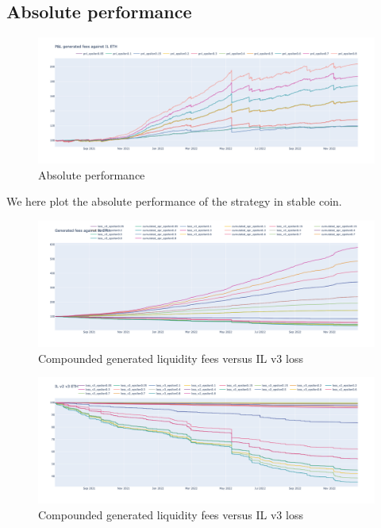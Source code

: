 \documentclass[conference]{IEEEtran}
\begin{document}
\subsection{Absolute performance}
\begin{figure}[h!]
    \centering
    \includegraphics[scale=0.15]{Plots/PL_generated_fees_against_IL_borrow rate_transaction cost_ETH.png}
    \caption{Absolute performance}
    \label{fig:abs_perf}
\end{figure}
We here plot the absolute performance of the strategy in stable coin. \\
\begin{figure}[h!]
    \centering
    \includegraphics[scale=0.15]{Plots/Generated_fees_against_IL_ETH.png}
    \caption{Compounded generated liquidity fees versus IL v3 loss}
    \label{fig:fees_agains_apr}
\end{figure}

\begin{figure}[h!]
    \centering
    \includegraphics[scale=0.15]{Plots/IL_v2_v3_ETH.png}
    \caption{Compounded generated liquidity fees versus IL v3 loss}
    \label{fig:il_v2_v3}
\end{figure}
\end{document}

